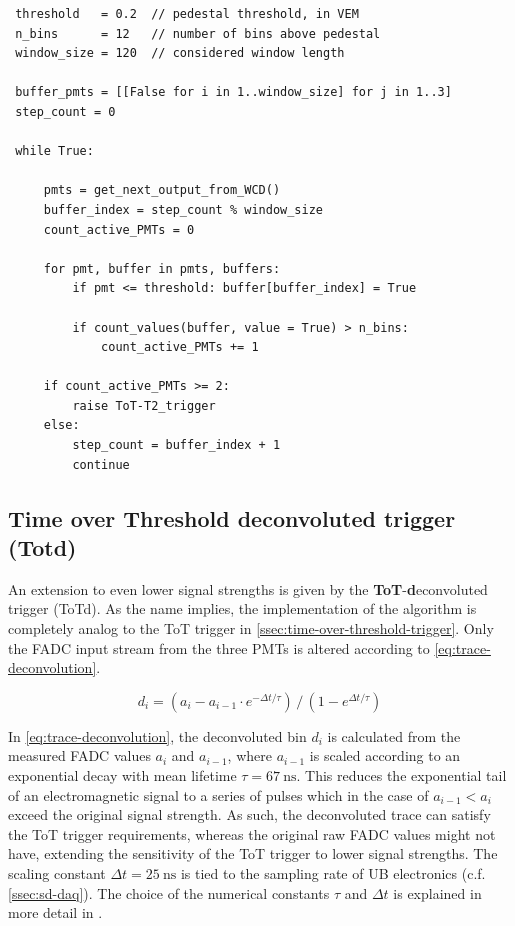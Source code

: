 \begin{lstlisting}
 threshold   = 0.2  // pedestal threshold, in VEM
 n_bins      = 12   // number of bins above pedestal
 window_size = 120  // considered window length

 buffer_pmts = [[False for i in 1..window_size] for j in 1..3] 
 step_count = 0

 while True:

     pmts = get_next_output_from_WCD()
     buffer_index = step_count % window_size
     count_active_PMTs = 0

     for pmt, buffer in pmts, buffers:
         if pmt <= threshold: buffer[buffer_index] = True

         if count_values(buffer, value = True) > n_bins:
             count_active_PMTs += 1

     if count_active_PMTs >= 2:
         raise ToT-T2_trigger
     else:
         step_count = buffer_index + 1
         continue
\end{lstlisting}
    

\subsection{Time over Threshold deconvoluted trigger (Totd)}
\label{ssec:time-over-threshold-deconvoluted}

An extension to even lower signal strengths is given by the \textbf{ToT}-\textbf{d}econvoluted trigger (ToTd). As the name implies, the implementation of the 
algorithm is completely analog to the ToT trigger in \autoref{ssec:time-over-threshold-trigger}. Only the FADC input stream from the three PMTs is altered 
according to \autoref{eq:trace-deconvolution}.

\begin{equation}
    \label{eq:trace-deconvolution}
    d_i = (a_i - a_{i-1}\cdot e^{-\Delta t/\tau})\,/\,(1 - e^{\Delta t/\tau}) 
\end{equation}

In \autoref{eq:trace-deconvolution}, the deconvoluted bin $d_i$ is calculated from the measured FADC values $a_i$ and $a_{i-1}$, where $a_{i-1}$ is scaled 
according to an exponential decay with mean lifetime $\tau = \SI{67}{\nano\second}$. This reduces the exponential tail of an electromagnetic signal to a 
series of pulses which in the case of $a_{i-1} < a_i$ exceed the original signal strength. As such, the deconvoluted trace can satisfy the ToT trigger 
requirements, whereas the original raw FADC values might not have, extending the sensitivity of the ToT trigger to lower signal strengths. The scaling constant 
$\Delta t = \SI{25}{\nano\second}$ is tied to the sampling rate of UB electronics (c.f. \autoref{ssec:sd-daq}). The choice of the numerical constants $\tau$ and 
$\Delta t$ is explained in more detail in \cite{ToTtriggerIdea}.

